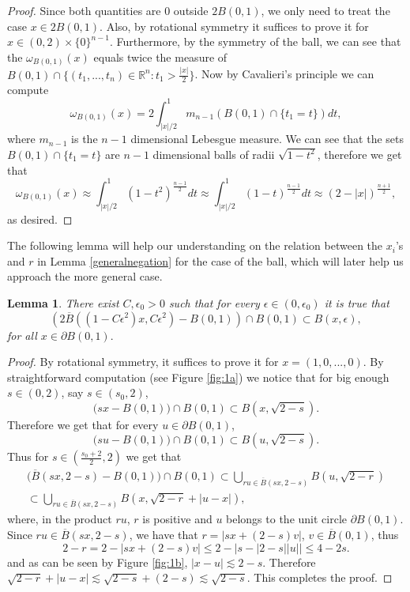 \documentclass[footinclude=true]{amsart}
\theoremstyle{plain}
\newtheorem{lm}[theo]{Lemma}
\begin{document}
	\begin{proof}
		Since both quantities are $0$ outside $2B(0,1)$, we only need to treat the case $x\in 2B(0,1)$. Also, by rotational symmetry it suffices to prove it for $x\in(0,2)\times\{0\}^{n-1}$. Furthermore, by the symmetry of the ball, we can see that the $\omega_{B(0,1)}(x)$ equals twice the measure of $B(0,1)\cap \{(t_1,...,t_n)\in\mathbb{R}^{n}:t_{1}>\frac{|x|}{2}\}$. Now by Cavalieri's principle we can compute 
		$$\omega_{B(0,1)}(x)=2\int_{|x|/2}^{1}m_{n-1}(B(0,1)\cap \{t_{1}=t\})dt,$$ where $m_{n-1}$ is the $n-1$ dimensional Lebesgue measure. We can see that the sets $B(0,1)\cap \{t_{1}=t\}$ are $n-1$ dimensional balls of radii $\sqrt{1-t^{2}}$, therefore we get that 
		$$\omega_{B(0,1)}(x)\approx \int_{|x|/2}^{1}(1-t^{2})^{\frac{n-1}{2}}dt\approx \int_{|x|/2}^{1}(1-t)^{\frac{n-1}{2}}dt\approx (2-|x|)^{\frac{n+1}{2}},$$ as desired.
	\end{proof}
	The following lemma will help our understanding on the relation between the $x_{i}$'s and $r$ in Lemma \ref{generalnegation} for the case of the ball, which will later help us approach the more general case. 
	\begin{lm}\label{disc}
		There exist $C,\epsilon_{0}>0$ such that for every $\epsilon\in(0,\epsilon_{0})$ it is true that 
		$$(2\overline{B}((1-C\epsilon^{2})x,C\epsilon^{2})-B(0,1))\cap B(0,1)\subset B(x,\epsilon),$$ for all $x\in \partial B(0,1).$
	\end{lm}
	\begin{proof}
		By rotational symmetry, it suffices to prove it for $x=(1,0,...,0)$. By straightforward computation (see Figure \ref{fig:1a}) we notice that for big enough $s\in (0,2)$, say $s\in (s_{0},2)$,
		$$\big(sx-B(0,1)\big)\cap B(0,1)\subset B(x,\sqrt{2-s}).$$ 
		Therefore we get that for every $u\in\partial B(0,1)$,
		$$\big(su-B(0,1)\big)\cap B(0,1)\subset B(u,\sqrt{2-s}).$$
		Thus for $s\in (\frac{s_{0}+2}{2},2)$ we get that
		\begin{multline*}
			\big(\overline{B}(sx,2-s)-B(0,1))\cap B(0,1)\subset \bigcup_{ru\in \overline{B}(sx,2-s)} B(u,\sqrt{2-r}) \\
			\subset \bigcup_{ru\in \overline{B}(sx,2-s)} B(x,\sqrt{2-r}+|u-x|),
		\end{multline*}
		where, in the product $ru$, $r$ is positive and $u$ belongs to the unit circle $\partial B(0,1).$ 
		Since $ru\in \overline{B}(sx,2-s)$, we have that $r=|sx+(2-s)v|$, $v\in \overline{B}(0,1)$, thus
		$$2-r=2-|sx+(2-s)v|\leq 2-\big|s-|2-s||u|\big|\leq 4-2s. $$
		and as can be seen by Figure \ref{fig:1b}, $|x-u|\lesssim 2-s$. Therefore $\sqrt{2-r}+|u-x|\lesssim\sqrt{2-s}+(2-s)\lesssim \sqrt{2-s}$. This completes the proof.
	\end{proof}
\end{document}
